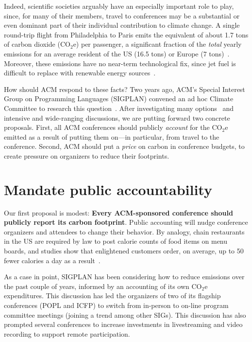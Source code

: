 \documentclass[12pt]{article}
\newcommand{\bcp}[1]{\ifdraft{\bf [bcp: #1]}\fi}
\newcommand{\mwh}[1]{\ifdraft{\bf [mwh: #1]}\fi}
\newcommand{\COtwoE}{CO$_2$e}
\newcommand{\SECTION}{\section*}
\begin{document}
Indeed, scientific societies arguably have an especially important role to
play, since, for many of their members, travel to conferences may be a
substantial or even dominant part of their individual contribution to
climate change.  A single round-trip flight from Philadelphia to Paris emits
the equivalent of about 1.7 tons of carbon dioxide (\COtwoE) per
passenger\iflater\bcp{Citation?}\fi, a significant fraction of the
{\em total} yearly emissions for an average resident of the US (16.5 tons)
or Europe (7 tons)~\cite{emissions}.  
Moreover, these emissions have no near-term technological
fix, since jet fuel is difficult to replace with renewable energy
sources~\cite{elec-air}.

How should ACM respond to these facts?  Two years ago, \mwh{Three, now?} ACM's Special
Interest Group on Programming Languages (SIGPLAN) convened an ad hoc Climate
Committee to research this question~\cite{ClimateCommittee}.  After
investigating many options~\cite{ClimateCommitteReport} and intensive and
wide-ranging discussions, we are putting forward two concrete
proposals. First, all ACM 
conferences should publicly {\em account} for the {\COtwoE} emitted as a
result of putting them on---in particular, from travel to
the conference. Second, ACM should put a \emph{price} on 
carbon in conference budgets, to create pressure on organizers to reduce
their footprints.

\SECTION{Mandate public accountability} 

Our first proposal is modest: {\bf Every ACM-sponsored conference should
publicly report its carbon footprint}.  
%
Public accounting will nudge conference organizers and attendees to change
their behavior. By analogy, chain restaurants in the US are required by law
to post calorie counts of food items on menu boards, and studies show that
enlightened customers order, on average, up to 50 fewer calories a day as a
result~\cite{menu}.  

As a case in point, SIGPLAN has been considering how to reduce emissions
over the past couple of years, informed by an accounting of its own
{\COtwoE} expenditures. This discussion has led the organizers of two of its
flagship conferences (POPL and ICFP) to switch from in-person to on-line
program committee meetings (joining a trend among other SIGs). This
discussion has also prompted several conferences to increase investments in
livestreaming and video recording to support remote participation.
\end{document}
